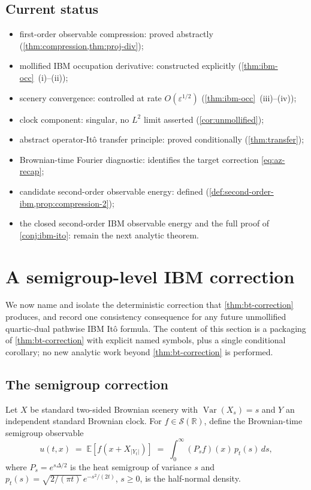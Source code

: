 \documentclass[11pt,reqno]{amsart}
\theoremstyle{plain}
\theoremstyle{definition}
\theoremstyle{remark}
\newcommand{\R}{\mathbb{R}}
\newcommand{\E}{\mathbb{E}}
\DeclareMathOperator{\Var}{Var}
\begin{document}
\subsection*{Current status}

\begin{itemize}
\item first-order observable compression: proved abstractly
  (\cref{thm:compression,thm:proj-div});
\item mollified IBM occupation derivative: constructed explicitly
  (\cref{thm:ibm-occ}~(i)--(ii));
\item scenery convergence: controlled at rate $O(\varepsilon^{1/2})$
  (\cref{thm:ibm-occ}~(iii)--(iv));
\item clock component: singular, no $L^{2}$ limit asserted
  (\cref{cor:unmollified});
\item abstract operator-It\^o transfer principle: proved conditionally
  (\cref{thm:transfer});
\item Brownian-time Fourier diagnostic: identifies the target
  correction \eqref{eq:az-recap};
\item candidate second-order observable energy: defined
  (\cref{def:second-order-ibm,prop:compression-2});
\item the closed second-order IBM observable energy and the full
  proof of \cref{conj:ibm-ito}: remain the next analytic theorem.
\end{itemize}

\section{A semigroup-level IBM correction}\label{sec:sg-correction}

We now name and isolate the deterministic correction that
\cref{thm:bt-correction} produces, and record one consistency
consequence for any future unmollified quartic-dual pathwise IBM
It\^o formula. The content of
this section is a packaging of \cref{thm:bt-correction} with explicit
named symbols, plus a single conditional corollary; no new analytic
work beyond \cref{thm:bt-correction} is performed.

\subsection*{The semigroup correction}

Let $X$ be standard two-sided Brownian scenery with $\Var(X_s)=s$ and
$Y$ an independent standard Brownian clock. For $f\in\mathscr S(\R)$,
define the Brownian-time semigroup observable
\begin{equation}\label{eq:sg-u}
  u(t,x)\;=\;\E[f(x+X_{|Y_t|})]
   \;=\;\int_0^\infty(P_s f)(x)\,p_t(s)\,ds,
\end{equation}
where $P_s=e^{s\Delta/2}$ is the heat semigroup of variance $s$ and
$p_t(s)=\sqrt{2/(\pi t)}\,e^{-s^{2}/(2t)}$, $s\ge 0$, is the half-normal
density.
\end{document}
